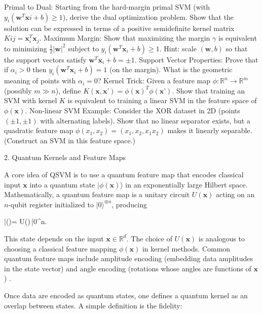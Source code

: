 Primal to Dual: Starting from the hard-margin primal SVM (with $y_i(\mathbf{w}^T\mathbf{x}i+b)\ge1$), derive the dual optimization problem. Show that the solution can be expressed in terms of a positive semidefinite kernel matrix $K{ij} = \mathbf{x}_i^T\mathbf{x}_j$.
Maximum Margin: Show that maximizing the margin $\gamma$ is equivalent to minimizing $\frac{1}{2}|\mathbf{w}|^2$ subject to $y_i(\mathbf{w}^T\mathbf{x}_i+b)\ge1$.  Hint: scale $(\mathbf{w},b)$ so that the support vectors satisfy $\mathbf{w}^T\mathbf{x}_i+b=\pm1$.
Support Vector Properties: Prove that if $\alpha_i>0$ then $y_i(\mathbf{w}^T\mathbf{x}_i+b)=1$ (on the margin).  What is the geometric meaning of points with $\alpha_i=0$?
Kernel Trick: Given a feature map $\phi:\mathbb{R}^n\to\mathbb{R}^m$ (possibly $m\gg n$), define $K(\mathbf{x},\mathbf{x}’)=\phi(\mathbf{x})^T\phi(\mathbf{x}’)$.  Show that training an SVM with kernel $K$ is equivalent to training a linear SVM in the feature space of $\phi(\mathbf{x})$.
Non-linear SVM Example: Consider the XOR dataset in 2D (points $(\pm1,\pm1)$ with alternating labels).  Show that no linear separator exists, but a quadratic feature map $\phi(x_1,x_2)=(x_1,x_2,x_1x_2)$ makes it linearly separable.  (Construct an SVM in this feature space.)






2. Quantum Kernels and Feature Maps





A core idea of QSVM is to use a quantum feature map that encodes classical input $\mathbf{x}$ into a quantum state $|\phi(\mathbf{x})\rangle$ in an exponentially large Hilbert space.  Mathematically, a quantum feature map is a unitary circuit $U(\mathbf{x})$ acting on an $n$-qubit register initialized to $|0\rangle^{\otimes n}$, producing

|\phi()\rangle \;=\; U()\,|0\rangle^{\otimes n}.

This state depends on the input $\mathbf{x}\in\mathbb{R}^d$.  The choice of $U(\mathbf{x})$ is analogous to choosing a classical feature mapping $\phi(\mathbf{x})$ in kernel methods.  Common quantum feature maps include amplitude encoding (embedding data amplitudes in the state vector) and angle encoding (rotations whose angles are functions of $\mathbf{x}$) .



Once data are encoded as quantum states, one defines a quantum kernel as an overlap between states.  A simple definition is the fidelity:

